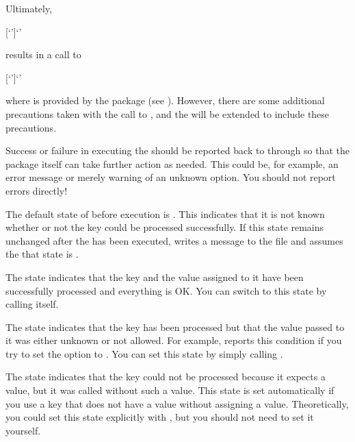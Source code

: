   \label{explain:scrbase.macro.DefineFamilyKey}%
  Ultimately,
\begin{lstcode}[escapeinside=`']
                  [`']{`'}
\end{lstcode}
  results in a call to
\begin{lstcode}[moretexcs={define@key},escapeinside=`']
             [`']{`'}
\end{lstcode}
  where  is provided by the
   package (see \cite{package:keyval}).
  However, there are some additional precautions taken with the call to
  , and the  will be extended to include these
  precautions.

Success or failure in executing the
 should be reported back to  through
 so that the package itself can take further action as
needed. This could be, for example, an error message or merely warning of an
unknown option. You should not report errors directly!

The default state of  before execution is
. This indicates that it is not known whether or
not the key could be processed successfully. If this state remains unchanged
after the  has been executed,  writes a
message to the  file and assumes the that state is
.

The  state indicates that the key and the value
assigned to it have been successfully processed and everything is OK. You can
switch to this state by calling  itself.

The  state indicates that the key has been
processed but that the value passed to it was either unknown or not allowed.
For example, \hyperref[cha:typearea]{} reports this
condition if you try to set the  option to
. You can set this state by simply calling
.

The  state indicates that the key could not be
processed because it expects a value, but it was called without such a value.
This state is set automatically if you use a key that does not have a
 value without assigning a value. Theoretically, you could
set this state explicitly with , but you should
not need to set it yourself.


